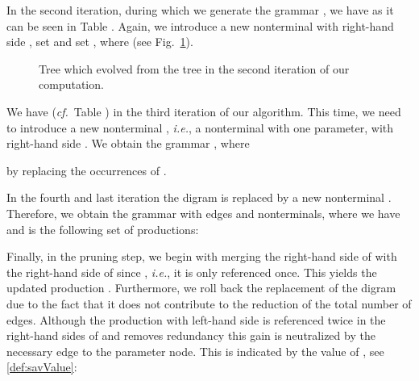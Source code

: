 \documentclass[12pt]{llncs}
\newcommand{\tp}{digram\xspace}
\newcommand{\hairsp}{\hspace{1pt}}\newcommand{\TODO}{\textcolor{red}{\bf TODO!}\xspace}
\newcommand{\ie}{\mbox{\textit{i.\hairsp{}e.}}\xspace}
\newcommand{\cf}{\textit{cf.}~}
\begin{document}
In the second iteration, during which we generate the grammar , we have  as it can be seen in Table . Again, we introduce a new nonterminal  with right-hand side , set  and set , where  (see Fig.~\ref{fig:treeAfterSecondRepl}).
\begin{figure}[t]
	\centering
	\caption{Tree  which evolved from the tree  in the second iteration of our computation.}\label{fig:treeAfterSecondRepl}
\end{figure}
We have  (\cf Table ) in the third iteration of our algorithm. This time, we need to introduce a new nonterminal , \ie, a nonterminal with one parameter, with right-hand side . We obtain the grammar , where

by replacing the  occurrences of .

In the fourth and last iteration the \tp  is replaced by a new nonterminal . Therefore, we obtain the grammar  with  edges and  nonterminals, where we have  and  is the following set of productions:

Finally, in the pruning step, we begin with merging the right-hand
side of  with the right-hand side of  since
, \ie, it is only referenced
once. This yields the updated production
. Furthermore,
we roll back the replacement of the \tp  due to the
fact that it does not contribute to the reduction of the total number
of edges. Although the production with left-hand side  is
referenced twice in the right-hand sides of  and
removes redundancy this gain is neutralized by the necessary edge to
the parameter node. This is indicated by the
 value of , see \eqref{def:savValue}:
\end{document}
